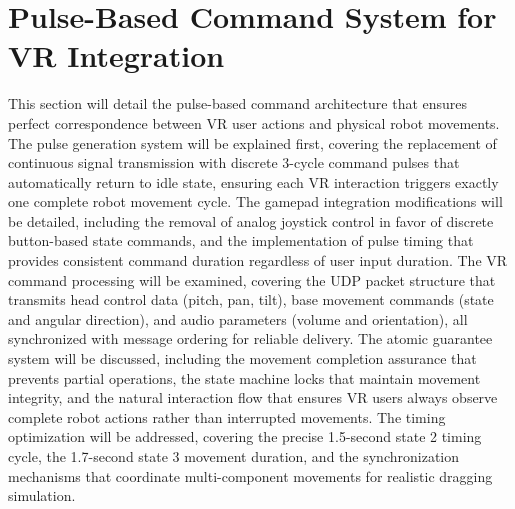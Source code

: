 \section{Pulse-Based Command System for VR Integration}
This section will detail the pulse-based command architecture that ensures perfect correspondence between VR user actions and physical robot movements. The pulse generation system will be explained first, covering the replacement of continuous signal transmission with discrete 3-cycle command pulses that automatically return to idle state, ensuring each VR interaction triggers exactly one complete robot movement cycle. The gamepad integration modifications will be detailed, including the removal of analog joystick control in favor of discrete button-based state commands, and the implementation of pulse timing that provides consistent command duration regardless of user input duration. The VR command processing will be examined, covering the UDP packet structure that transmits head control data (pitch, pan, tilt), base movement commands (state and angular direction), and audio parameters (volume and orientation), all synchronized with message ordering for reliable delivery. The atomic guarantee system will be discussed, including the movement completion assurance that prevents partial operations, the state machine locks that maintain movement integrity, and the natural interaction flow that ensures VR users always observe complete robot actions rather than interrupted movements. The timing optimization will be addressed, covering the precise 1.5-second state 2 timing cycle, the 1.7-second state 3 movement duration, and the synchronization mechanisms that coordinate multi-component movements for realistic dragging simulation.


